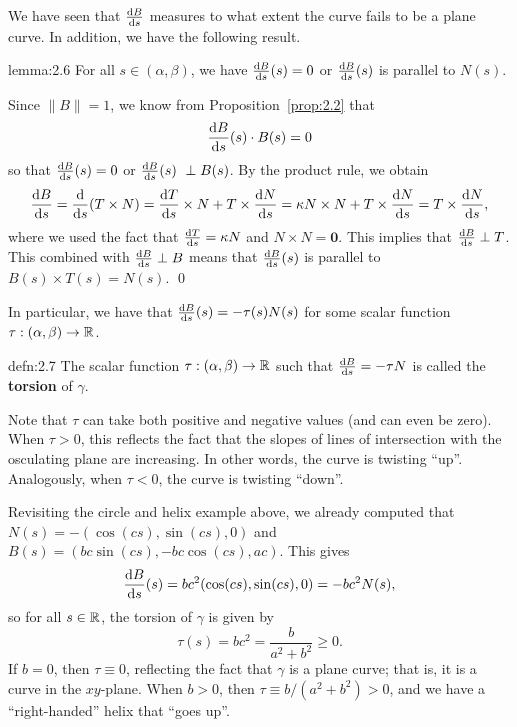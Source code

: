 We have seen that $\frac{{\rm d}B}{{\rm d}s}$ measures to what extent the curve 
fails to be a plane curve. In addition, we have the following result. 

\begin{lemma}{lemma:2.6}
    For all $s \in (\alpha, \beta)$, we have $\frac{{\rm d}B}{{\rm d}s}(s) = 0$ 
    or $\frac{{\rm d}B}{{\rm d}s}(s)$ is parallel to $N(s)$.
\end{lemma}\vspace{-0.25cm}
\begin{pf}
    Since $\|B\| = 1$, we know from Proposition~\ref{prop:2.2} that 
    \[ \frac{{\rm d}B}{{\rm d}s}(s) \cdot B(s) = 0 \] 
    so that $\frac{{\rm d}B}{{\rm d}s}(s) = 0$ or $\frac{{\rm d}B}{{\rm d}s}(s) \
    \perp B(s)$. By the product rule, we obtain 
    \begin{align*}
        \frac{{\rm d}B}{{\rm d}s} = \frac{{\rm d}}{{\rm d}s}(T \times N) 
        = \frac{{\rm d}T}{{\rm d}s} \times N + T \times \frac{{\rm d}N}{{\rm d}s}
        = \kappa N \times N + T \times \frac{{\rm d}N}{{\rm d}s}
        = T \times \frac{{\rm d}N}{{\rm d}s}, 
    \end{align*}
    where we used the fact that $\frac{{\rm d}T}{{\rm d}s} = \kappa N$ 
    and $N \times N = \mathbf 0$. This implies that 
    $\frac{{\rm d}B}{{\rm d}s} \perp T$. This combined with 
    $\frac{{\rm d}B}{{\rm d}s} \perp B$ means that 
    $\frac{{\rm d}B}{{\rm d}s}(s)$ is parallel to $B(s) \times T(s) = N(s)$. \qed 
\end{pf}\vspace{-0.25cm}

In particular, we have that $\frac{{\rm d}B}{{\rm d}s}(s) = -\tau(s)N(s)$ 
for some scalar function $\tau : (\alpha, \beta) \to \mathbb{R}$. 

\begin{defn}{defn:2.7}
    The scalar function $\tau : (\alpha, \beta) \to \mathbb{R}$ such that 
    $\frac{{\rm d}B}{{\rm d}s} = -\tau N$
    is called the {\bf torsion} of $\gamma$. 
\end{defn}\vspace{-0.25cm}
Note that $\tau$ can take both positive and negative values (and can 
even be zero). When $\tau > 0$, this reflects the fact that the slopes 
of lines of intersection with the osculating plane are increasing. 
In other words, the curve is twisting ``up''. Analogously, 
when $\tau < 0$, the curve is twisting ``down''. 

Revisiting the circle and helix example above, we already computed that 
$N(s) = -(\cos(cs), \sin(cs), 0)$ and $B(s) = 
(bc\sin(cs), -bc\cos(cs), ac)$. This gives 
\[ \frac{{\rm d}B}{{\rm d}s}(s) = bc^2(\cos(cs), \sin(cs), 0) = -bc^2 N(s), \] 
so for all $s \in \mathbb{R}$, the torsion of $\gamma$ is given by 
\[ \tau(s) = bc^2 = \frac{b}{a^2+b^2} \geq 0. \]
If $b = 0$, then $\tau \equiv 0$, reflecting the fact that $\gamma$ is a 
plane curve; that is, it is a curve in the $xy$-plane. When $b > 0$, 
then $\tau \equiv b/(a^2 + b^2) > 0$, and we have a ``right-handed'' helix 
that ``goes up''.


